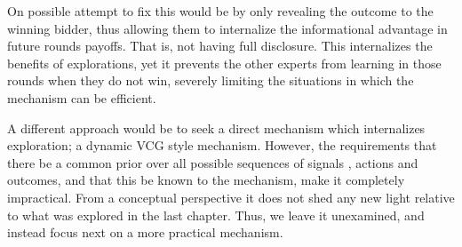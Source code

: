 On possible attempt to fix this would be by only revealing the outcome to the winning bidder, thus allowing them to internalize the informational advantage in future rounds payoffs. 
That is, not having full disclosure. 
This  internalizes the benefits of explorations, yet it prevents the other experts from learning in those rounds when they do not win, severely limiting the situations in which the mechanism can be efficient.






A different approach would be to seek a direct mechanism which internalizes exploration; a dynamic VCG style mechanism.
However, the requirements that there be a common prior over all possible sequences of signals , actions and outcomes, and that this be known to the mechanism, make it completely impractical. 
From a conceptual perspective it does not shed any new light relative to what was explored in the last chapter.
Thus, we leave it unexamined, and instead focus next on a more practical mechanism.


